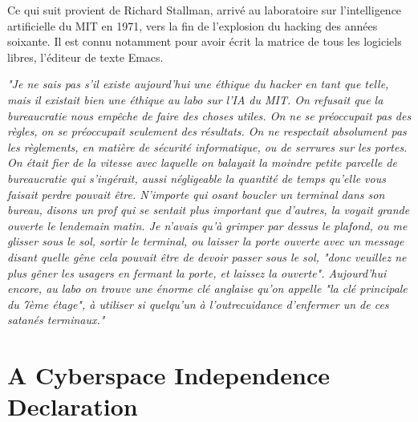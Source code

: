 \documentclass[11pt,twoside,a4paper]{book}
\begin{document}
Ce qui suit provient de Richard Stallman, arriv{\'e} au laboratoire sur l'intelligence artificielle du MIT en 1971, vers la fin de l'explosion du hacking des ann{\'e}es soixante. Il est connu notamment pour avoir {\'e}crit la matrice de tous les logiciels libres, l'{\'e}diteur de texte Emacs. %

	\emph{\footnotesize "Je ne sais pas s'il existe aujourd'hui une {\'e}thique du hacker en tant que telle, mais il existait bien une {\'e}thique au labo sur l'IA du MIT. On refusait que la bureaucratie nous emp{\^e}che de faire des choses utiles. On ne se pr{\'e}occupait pas des r{\`e}gles, on se pr{\'e}occupait seulement des r{\'e}sultats. On ne respectait absolument pas les r{\`e}glements, en mati{\`e}re de s{\'e}curit{\'e} informatique, ou de serrures sur les portes. On {\'e}tait fier de la vitesse avec laquelle on balayait la moindre petite parcelle de bureaucratie qui s'ing{\'e}rait, aussi n{\'e}gligeable la quantit{\'e} de temps qu'elle vous faisait perdre pouvait {\^e}tre. N'importe qui osant boucler un terminal dans son bureau, disons un prof qui se sentait plus important que d'autres, la voyait grande ouverte le lendemain matin. Je n'avais qu'{\`a} grimper par dessus le plafond, ou me glisser sous le sol, sortir le terminal, ou laisser la porte ouverte avec un message disant quelle g{\^e}ne cela pouvait {\^e}tre de devoir passer sous le sol, "donc veuillez ne plus g{\^e}ner les usagers en fermant la porte, et laissez la ouverte". Aujourd'hui encore, au labo on trouve une {\'e}norme cl{\'e} anglaise qu'on appelle "la cl{\'e} principale du 7{\`e}me {\'e}tage", {\`a} utiliser si quelqu'un {\`a} l'outrecuidance d'enfermer un de ces satan{\'e}s terminaux."} %

\clearpage

\section{A Cyberspace Independence Declaration}
\end{document}
